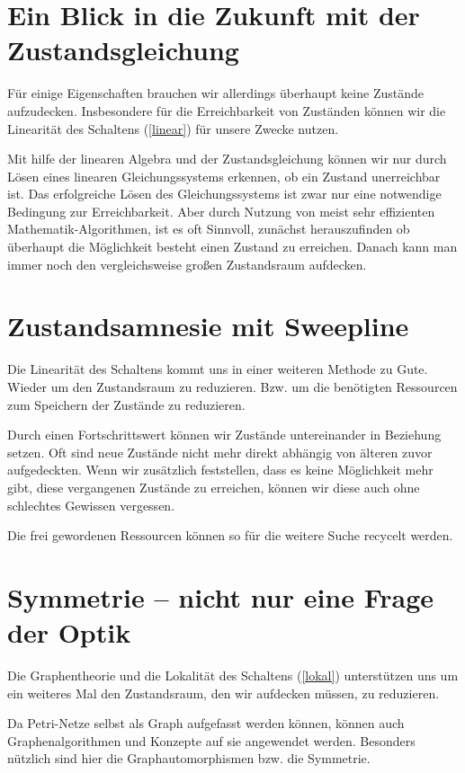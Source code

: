 \section{Ein Blick in die Zukunft mit der Zustandsgleichung}
Für einige Eigenschaften brauchen wir allerdings überhaupt keine Zustände aufzudecken.
Insbesondere für die Erreichbarkeit von Zuständen können wir die Linearität des Schaltens (\ref{linear}) für unsere Zwecke nutzen.

Mit hilfe der linearen Algebra und der Zustandsgleichung können wir nur durch Lösen eines linearen Gleichungssystems erkennen, ob ein Zustand unerreichbar ist.
Das erfolgreiche Lösen des Gleichungssystems ist zwar nur eine notwendige Bedingung zur Erreichbarkeit.
Aber durch Nutzung von meist sehr effizienten Mathematik-Algorithmen, ist es oft Sinnvoll, zunächst herauszufinden ob überhaupt die Möglichkeit besteht einen Zustand zu erreichen. Danach kann man immer noch den vergleichsweise großen Zustandsraum aufdecken.

\section{Zustandsamnesie mit Sweepline}
Die Linearität des Schaltens kommt uns in einer weiteren Methode zu Gute.
Wieder um den Zustandsraum zu reduzieren. Bzw. um die benötigten Ressourcen zum Speichern der Zustände zu reduzieren.

Durch einen Fortschrittswert können wir Zustände untereinander in Beziehung setzen.
Oft sind neue Zustände nicht mehr direkt abhängig von älteren zuvor aufgedeckten.
Wenn wir zusätzlich feststellen, dass es keine Möglichkeit mehr gibt, diese vergangenen Zustände zu erreichen, können wir diese auch ohne schlechtes Gewissen vergessen.

Die frei gewordenen Ressourcen können so für die weitere Suche recycelt werden.

\section{Symmetrie -- nicht nur eine Frage der Optik}
Die Graphentheorie und die Lokalität des Schaltens (\ref{lokal}) unterstützen uns um ein weiteres Mal den Zustandsraum, den wir aufdecken müssen, zu reduzieren.

Da Petri-Netze selbst als Graph aufgefasst werden können, können auch Graphenalgorithmen  und Konzepte auf sie angewendet werden. 
Besonders nützlich sind hier die Graphautomorphismen bzw. die Symmetrie.

